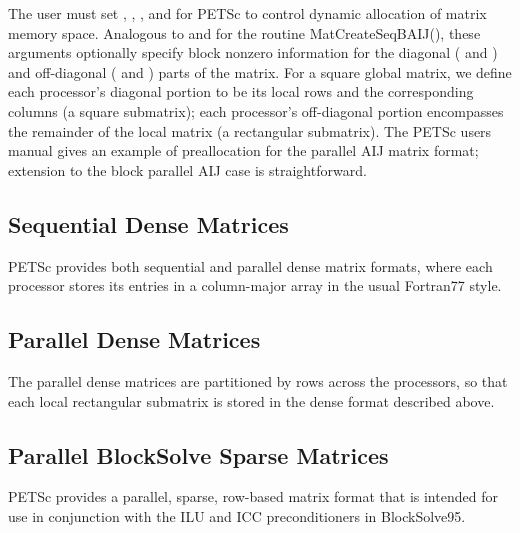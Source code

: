 \documentclass[twoside,12pt]{../sty/report_petsc}
\begin{document}
The user must set , , , and 
 for PETSc to control dynamic allocation of matrix
memory space.  Analogous to  and  for the routine 
MatCreateSeqBAIJ(), these arguments optionally specify 
block nonzero information for the diagonal ( and ) and 
off-diagonal ( and ) parts of the matrix. 
For a square global matrix, we define each processor's diagonal portion 
to be its local rows and the corresponding columns (a square submatrix);  
each processor's off-diagonal portion encompasses the remainder of the
local matrix (a rectangular submatrix).  
The PETSc users manual gives an example of preallocation for
the parallel AIJ matrix format; extension to the block parallel AIJ case
is straightforward.

\subsection{Sequential Dense Matrices}

PETSc provides both sequential and parallel dense matrix formats,
where each processor stores its entries in a column-major array in the
usual Fortran77 style. 

\subsection{Parallel Dense Matrices}

The parallel dense matrices are partitioned by rows across the
processors, so that each local rectangular submatrix is stored in the
dense format described above.

\subsection{Parallel BlockSolve Sparse Matrices}

PETSc provides a parallel, sparse, row-based matrix format that is
intended for use in conjunction with the ILU and ICC preconditioners
in BlockSolve95.  





\end{document}
